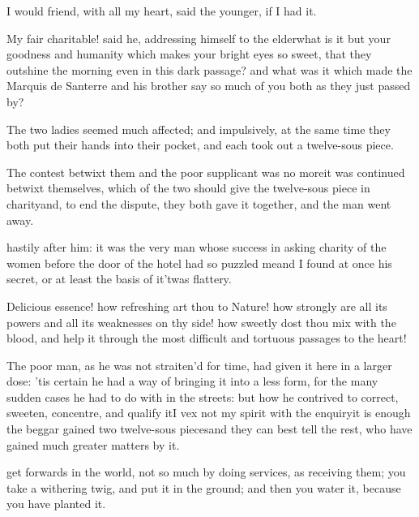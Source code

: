 \documentclass[twoside]{article}
\begin{document}
\tskk I would friend, with all my heart,
said the younger, if I had it.

My fair charitable! said he, addressing
himself to the elder\tskk what is it but
your goodness and humanity which makes
your bright eyes so sweet, that they
outshine the morning even in this dark
passage? and what was it which made the
Marquis de Santerre and his brother say so
much of you both as they just passed by?

The two ladies seemed much affected; and
impulsively, at the same time they both
put their hands into their pocket, and
each took out a twelve-sous piece.

The contest betwixt them and the poor
supplicant was no more\tskk it was
continued betwixt themselves, which of the
two should give the twelve-sous piece in
charity\tskk and, to end the dispute,
they both gave it together, and the man
went away.





\vskip 6pt


 hastily after him: it
was the very man whose success in asking
charity of the women before the door of
the hotel had so puzzled me\tskk and I
found at once his secret, or at least the
basis of it\tskk ’twas flattery.

Delicious essence! how refreshing art thou
to Nature! how strongly are all its powers
and all its weaknesses on thy side! how
sweetly dost thou mix with the blood, and
help it through the most difficult and
tortuous passages to the heart!

The poor man, as he was not straiten’d for
time, had given it here in a larger dose:
’tis certain he had a way of bringing it
into a less form, for the many sudden
cases he had to do with in the streets:
but how he contrived to correct, sweeten,
concentre, and qualify it\tskk I vex not
my spirit with the enquiry\tskk it is
enough the beggar gained two twelve-sous
pieces\tskk and they can best tell the
rest, who have gained much greater matters
by it.





\vskip 6pt


 get forwards in the world,
not so much by doing services, as
receiving them; you take a withering twig,
and put it in the ground; and then you
water it, because you have planted it.
\end{document}
